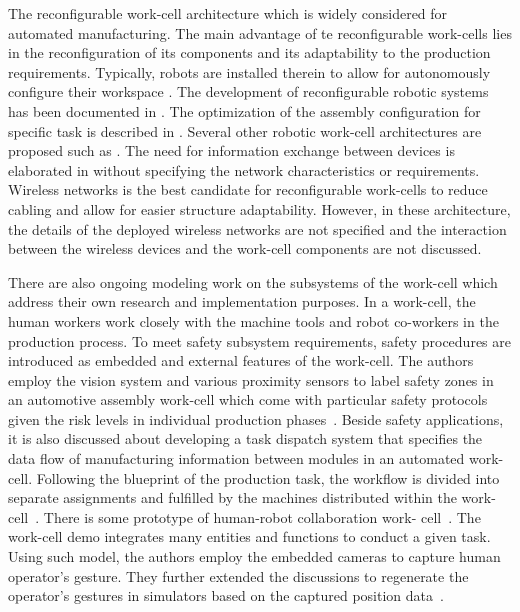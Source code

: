 	The reconfigurable work-cell architecture which is widely considered for automated manufacturing. The main advantage of te reconfigurable work-cells lies in the reconfiguration of its components and its adaptability to the production requirements. Typically, robots are installed therein to allow for autonomously configure their workspace \cite{8023523,10.1007/978-3-319-65151-4_10,6059204}. The development of reconfigurable robotic systems has been documented in \cite{Fulea}. The optimization of the assembly configuration for specific task is described in \cite{CHEN2001199}. Several other robotic work-cell architectures are proposed such as \cite{OpenArch,CARPANZANO2007435}. The need for  information exchange between devices is elaborated in \cite{CARPANZANO2007435} without specifying the network characteristics or requirements. Wireless networks is the best candidate for reconfigurable work-cells to reduce cabling and allow for easier structure adaptability. However, in these architecture, the details of the deployed wireless networks are not specified and the interaction between the wireless devices and the work-cell components are not discussed.   
	
	
	There are also ongoing modeling work on the subsystems of the work-cell which address their own research and implementation purposes. In a work-cell, the human workers work closely with the machine tools and robot co-workers in the production process.
	To meet safety subsystem requirements, safety procedures are introduced as embedded and external features of the work-cell. The authors employ the vision system and various proximity sensors to label safety zones in an automotive assembly work-cell which come with particular safety protocols given the risk levels in individual production phases~\cite{safeeye}. Beside safety applications, it is also discussed about developing a task dispatch system that specifies the data flow of manufacturing information between modules in an automated work-cell. Following the blueprint of the production task, the workflow is divided into separate assignments and fulfilled by the machines distributed within the work-cell~\cite{IkeaBot}. There is some   prototype of human-robot collaboration work- cell~\cite{cobotcell}. The work-cell demo integrates many entities and functions to conduct a given task. Using such model, the authors employ the embedded cameras to capture human operator's gesture. They further extended the discussions to regenerate the operator’s gestures in simulators based on the captured position data~\cite{gesture}.   
    
